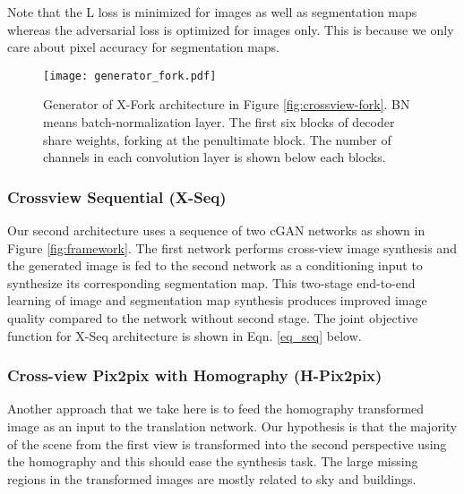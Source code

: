 \documentclass[times,twocolumn,final,authoryear]{elsarticle_modified}
\begin{document}
\vspace{-15pt}



Note that the L loss is minimized for images as well as segmentation maps whereas the adversarial loss is optimized for images only. This is because we only care about pixel accuracy for segmentation maps. 


\begin{figure}
\centering
\texttt{[image: generator\_fork.pdf]}
\caption{\small \label{fig:crossview-fork-gen}Generator of X-Fork architecture in Figure \ref{fig:crossview-fork}. BN means batch-normalization layer.
The first six blocks of decoder share weights, forking at the penultimate block. 
The number of channels in each convolution layer is shown below each blocks. }
\vspace{-15pt}
\end{figure}

\vspace{-5pt}

\subsubsection{\label{seq} Crossview Sequential (X-Seq)}
Our second architecture uses a sequence of two cGAN networks as shown in Figure \ref{fig:framework}. The first network performs cross-view image synthesis and the generated image is fed to the second network as a conditioning input to synthesize its corresponding segmentation map. This two-stage end-to-end learning of image and segmentation map synthesis produces improved image quality compared to the network without second stage. The joint objective function for X-Seq architecture is shown in Eqn. \ref{eq_seq} below.
\vspace{-15pt}



\vspace{-5pt}

\subsubsection{Cross-view Pix2pix with Homography (H-Pix2pix)}
Another approach that we take here is to feed the homography transformed image as an input to the translation network. 
Our hypothesis is that the majority of the scene from the first view is transformed into the second perspective using the homography and this should ease the synthesis task. The large missing regions in the transformed images are mostly related to sky and buildings.
\end{document}
